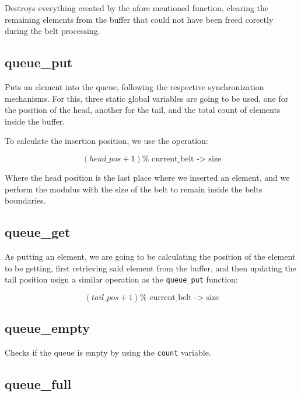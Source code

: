\documentclass[es]{uc3mreport}
\begin{document}
\begin{report}
      Destroys everything created by the afore mentioned function,
      clearing the remaining elements from the buffer that could not
      have been freed corectly during the belt processing.

      \subsection{queue\_put\(\)}

      \setcounter{subsubsection}{0}

      Puts an element into the queue, following the respective
      synchronization mechanisms. For this, three static global
      variables are going to be used, one for the position of the head,
      another for the tail, and the total count of elements inside the
      buffer.

      To calculate the insertion position, we use the operation:

      \[(head\_pos + 1) \% \text{ current\_belt -> size}\]

      Where the head position is the last place where we inserted an
      element, and we perform the modulus with the size of the belt to
      remain inside the belts boundaries.

      \subsection{queue\_get\(\)}

      \setcounter{subsubsection}{0}

      As putting an element, we are going to be calculating the position
      of the element to be getting, first retrieving said element from
      the buffer, and then updating the tail position usign a similar
      operation as the \texttt{queue\_put} function:

      \[(tail\_pos + 1) \% \text{ current\_belt -> size}\]

      \subsection{queue\_empty\(\)}

      \setcounter{subsubsection}{0}

      Checks if the queue is empty by using the \texttt{count} variable.

      \subsection{queue\_full\(\)}


\end{report}
\end{document}

